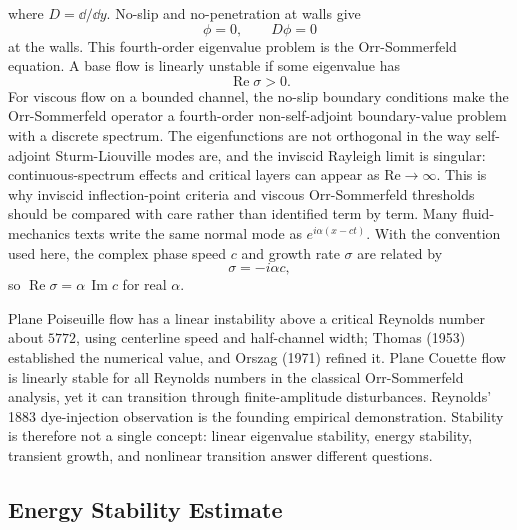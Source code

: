 where \(D=\dd/\dd y\). No-slip and no-penetration at walls give
\[
  \phi=0,\qquad D\phi=0
\]
at the walls. This fourth-order eigenvalue problem is the
Orr-Sommerfeld equation. A base flow is linearly unstable if some eigenvalue has
\[
  \operatorname{Re}\sigma>0.
\]
For viscous flow on a bounded channel, the no-slip boundary conditions make the
Orr-Sommerfeld operator a fourth-order non-self-adjoint boundary-value problem
with a discrete spectrum. The eigenfunctions are not orthogonal in the way
self-adjoint Sturm-Liouville modes are, and the inviscid Rayleigh limit is
singular: continuous-spectrum effects and critical layers can appear as
\(\mathrm{Re}\to\infty\). This is why inviscid inflection-point criteria and
viscous Orr-Sommerfeld thresholds should be compared with care rather than
identified term by term.
Many fluid-mechanics texts write the same normal mode as
\(e^{i\alpha(x-ct)}\). With the convention used here, the complex phase speed
\(c\) and growth rate \(\sigma\) are related by
\[
  \sigma=-i\alpha c,
\]
so \(\operatorname{Re}\sigma=\alpha\,\operatorname{Im}c\) for real
\(\alpha\).

\begin{remark}
Plane Poiseuille flow has a linear instability above a critical Reynolds number
about \(5772\), using centerline speed and half-channel width; Thomas (1953)
established the numerical value, and Orszag (1971) refined it. Plane Couette
flow is linearly stable for all Reynolds numbers in the classical
Orr-Sommerfeld analysis, yet it can transition through finite-amplitude
disturbances. Reynolds' 1883 dye-injection observation is the founding
empirical demonstration. Stability is therefore not a single concept:
linear eigenvalue stability, energy stability, transient growth, and nonlinear
transition answer different questions.
\end{remark}

\subsection{Energy Stability Estimate}
\label{subsec:energy-stability}

